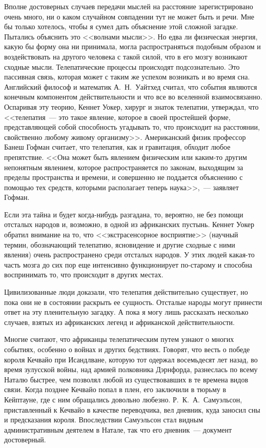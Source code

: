 \documentclass[12pt,a4paper,twoside,openany,svgnames]{memoir}
\begin{document}
Вполне достоверных случаев передачи мыслей на расстояние зарегистрировано очень много, ни о каком случайном совпадении тут не может быть и речи. Мне бы только хотелось, чтобы я сумел дать объяснение этой сложной загадке. Пытались объяснить это <<волнами мысли>>. Но едва ли физическая энергия, какую бы форму она ни принимала, могла распространяться подобным образом и воздействовать на другого человека с такой силой, что в его мозгу возникают сходные мысли. Телепатические процессы происходят подсознательно. Это пассивная связь, которая может с таким же успехом возникать и во время сна. Английский философ и математик А.~Н.~Уайтхед считал, что события являются конечным компонентом действительности и что все во вселенной взаимосвязанно. Оспаривая эту теорию, Кеннет Уокер, хирург и знаток телепатии, утверждал, что <<телепатия~--- это такое явление, которое в своей простейшей форме, представляющей собой способность угадывать то, что происходит на расстоянии, свойственно любому живому организму>>. Американский физик профессор Банеш Гофман считает, что телепатия, как и гравитация, обходит любое препятствие. <<Она может быть явлением физическим или каким-то другим непонятным явлением, которое распространяется по законам, выходящим за пределы пространства и времени, и совершенно не поддается объяснению с помощью тех средств, которыми располагает теперь наука>>,~--- заявляет Гофман.

Если эта тайна и будет когда-нибудь разгадана, то, вероятно, не без помощи отсталых народов и, возможно, в одной из африканских пустынь. Кеннет Уокер обратил внимание на то, что <<экстрасенсорное восприятие>> (научный термин, обозначающий телепатию, ясновидение и другие сходные с ними явления) очень распространено среди отсталых народов. У этих людей какая-то часть мозга до сих пор еще интенсивно функционирует по-старому и способна воспринимать то, что происходит в других местах.

Цивилизованные люди доказали, что телепатия действительно существует, но пока они не в состоянии раскрыть ее сущность. Отсталые народы могут принести ответ на эту пленительную загадку. А пока я могу лишь рассказать несколько случаев, взятых из африканских легенд и африканской действительности.

Многие считают, что африканцы телепатическим путем узнают о многих событиях, особенно о войнах и других бедствиях. Говорят, что весть о победе короля Кечвайо при Исандлване, которую тот одержал восемьдесят лет назад, во время зулусской войны, над армией полковника Дэрнфорда, разнеслась по всему Наталю быстрее, чем позволял любой из существовавших в те времена видов связи. Когда позднее Кечвайо попал в плен, его заключили в тюрьму в Кейптауне, где с ним обращались довольно любезно. Р.~К.~А.~Самуэльсон, приставленный к Кечвайо в качестве переводчика, вел дневник, куда заносил сны и предсказания короля. Впоследствии Самуэльсон стал видным административным деятелем в Натале, так что его дневник~--- документ достоверный.
\end{document}
